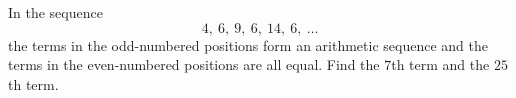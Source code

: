 In the sequence
\[4,\ 6,\ 9,\ 6,\ 14,\ 6,\ \dots\]
the terms in the odd-numbered positions form an arithmetic sequence and the terms in the even-numbered positions are all equal. Find the $7$th term and the $25$th term.
